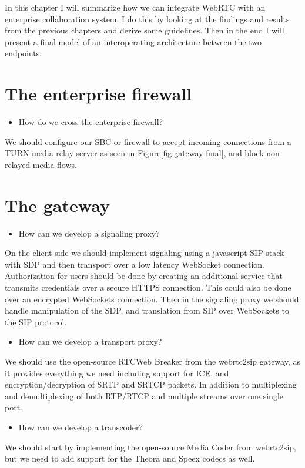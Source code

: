 In this chapter I will summarize how we can integrate WebRTC with an enterprise collaboration system. I do this by looking at the findings and results from the previous chapters and derive some guidelines. Then in the end I will present a final model of an interoperating architecture between the two endpoints.

\section{The enterprise firewall}

\begin{itemize}
\item How do we cross the enterprise firewall?
\end{itemize}
We should configure our SBC or firewall to accept incoming connections from a TURN media relay server as seen in Figure\ref{fig:gateway-final}, and block non-relayed media flows.

\section{The gateway}

\begin{itemize}
\item How can we develop a signaling proxy?
\end{itemize}
On the client side we should implement signaling using a javascript SIP stack with SDP and then transport over a low latency WebSocket connection. Authorization for users should be done by creating an additional service that transmits credentials over a secure HTTPS connection. This could also be done over an encrypted WebSockets connection. Then in the signaling proxy we should handle manipulation of the SDP, and translation from SIP over WebSockets to the SIP protocol.

\begin{itemize}
\item How can we develop a transport proxy?
\end{itemize}
We should use the open-source RTCWeb Breaker from the webrtc2sip gateway, as it provides everything we need including support for ICE, and encryption/decryption of SRTP and SRTCP packets. In addition to multiplexing and demultiplexing of both RTP/RTCP and multiple streams over one single port.

\begin{itemize}
\item How can we develop a transcoder?
\end{itemize}
We should start by implementing the open-source Media Coder from webrtc2sip, but we need to add support for the Theora and Speex codecs as well.

